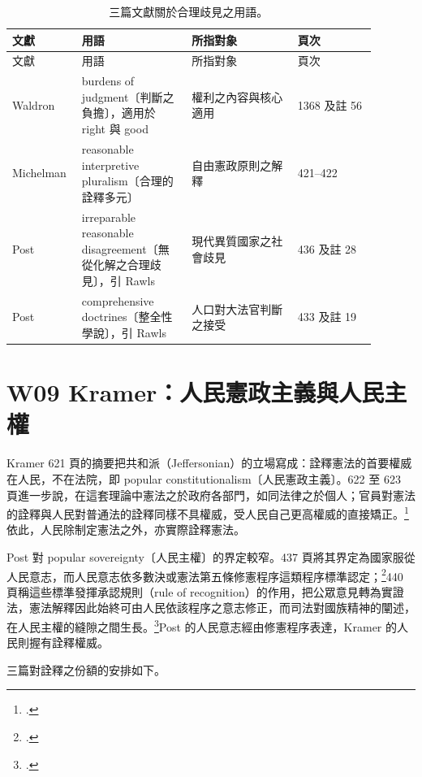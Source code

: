 \begin{longtable}{@{}L{0.14\linewidth}L{0.28\linewidth}L{0.27\linewidth}L{0.20\linewidth}@{}}
\caption{三篇文獻關於合理歧見之用語。}\\
\toprule
文獻 & 用語 & 所指對象 & 頁次 \\
\midrule
\endfirsthead
\toprule
文獻 & 用語 & 所指對象 & 頁次 \\
\midrule
\endhead
Waldron & burdens of judgment〔判斷之負擔〕，適用於 right 與 good & 權利之內容與核心適用 & 1368 及註 56 \\
Michelman & reasonable interpretive pluralism〔合理的詮釋多元〕 & 自由憲政原則之解釋 & 421--422 \\
Post & irreparable reasonable disagreement〔無從化解之合理歧見〕，引 Rawls & 現代異質國家之社會歧見 & 436 及註 28 \\
Post & comprehensive doctrines〔整全性學說〕，引 Rawls & 人口對大法官判斷之接受 & 433 及註 19 \\
\bottomrule
\end{longtable}

\section{W09 Kramer：人民憲政主義與人民主權}
\label{sec:80_comparison-2}

Kramer 621 頁的摘要把共和派（Jeffersonian）的立場寫成：詮釋憲法的首要權威在人民，不在法院，即 popular constitutionalism〔人民憲政主義〕。622 至 623 頁進一步說，在這套理論中憲法之於政府各部門，如同法律之於個人；官員對憲法的詮釋與人民對普通法的詮釋同樣不具權威，受人民自己更高權威的直接矯正。\footcite[621--623]{kramer2012}依此，人民除制定憲法之外，亦實際詮釋憲法。

Post 對 popular sovereignty〔人民主權〕的界定較窄。437 頁將其界定為國家服從人民意志，而人民意志依多數決或憲法第五條修憲程序這類程序標準認定；\footcite[437]{post1998}440 頁稱這些標準發揮承認規則（rule of recognition）的作用，把公眾意見轉為實證法，憲法解釋因此始終可由人民依該程序之意志修正，而司法對國族精神的闡述，在人民主權的縫隙之間生長。\footcite[440]{post1998}Post 的人民意志經由修憲程序表達，Kramer 的人民則握有詮釋權威。

三篇對詮釋之份額的安排如下。

